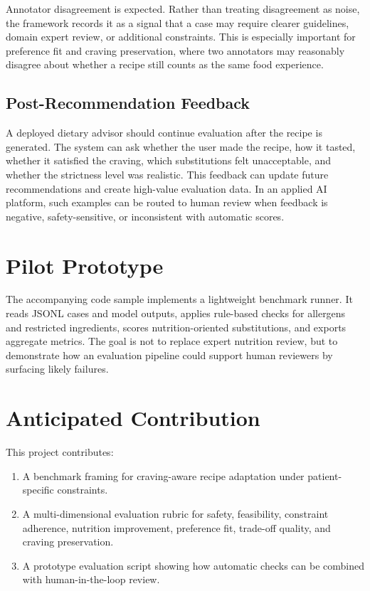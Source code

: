 \documentclass[11pt]{article}
\begin{document}
Annotator disagreement is expected. Rather than treating disagreement as noise, the framework records it as a signal that a case may require clearer guidelines, domain expert review, or additional constraints. This is especially important for preference fit and craving preservation, where two annotators may reasonably disagree about whether a recipe still counts as the same food experience.

\subsection{Post-Recommendation Feedback}
A deployed dietary advisor should continue evaluation after the recipe is generated. The system can ask whether the user made the recipe, how it tasted, whether it satisfied the craving, which substitutions felt unacceptable, and whether the strictness level was realistic. This feedback can update future recommendations and create high-value evaluation data. In an applied AI platform, such examples can be routed to human review when feedback is negative, safety-sensitive, or inconsistent with automatic scores.

\section{Pilot Prototype}
The accompanying code sample implements a lightweight benchmark runner. It reads JSONL cases and model outputs, applies rule-based checks for allergens and restricted ingredients, scores nutrition-oriented substitutions, and exports aggregate metrics. The goal is not to replace expert nutrition review, but to demonstrate how an evaluation pipeline could support human reviewers by surfacing likely failures.

\section{Anticipated Contribution}
This project contributes:

\begin{enumerate}[leftmargin=*]
    \item A benchmark framing for craving-aware recipe adaptation under patient-specific constraints.
    \item A multi-dimensional evaluation rubric for safety, feasibility, constraint adherence, nutrition improvement, preference fit, trade-off quality, and craving preservation.
    \item A prototype evaluation script showing how automatic checks can be combined with human-in-the-loop review.
\end{enumerate}
\end{document}
